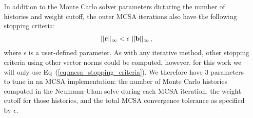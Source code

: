 In addition to the Monte Carlo solver parameters dictating the number
of histories and weight cutoff, the outer MCSA iterations also have
the following stopping criteria:
\begin{equation}
  ||\ve{r}||_\infty < \epsilon \ ||\ve{b}||_\infty\:,
  \label{eq:mcsa_stopping_criteria}
\end{equation}
where $\epsilon$ is a user-defined parameter. As with any iterative
method, other stopping criteria using other vector norms could be
computed, however, for this work we will only use
Eq~(\ref{eq:mcsa_stopping_criteria}). We therefore have 3 parameters
to tune in an MCSA implementation: the number of Monte Carlo histories
computed in the Neumann-Ulam solve during each MCSA iteration, the
weight cutoff for those histories, and the total MCSA convergence
tolerance as specified by $\epsilon$.

